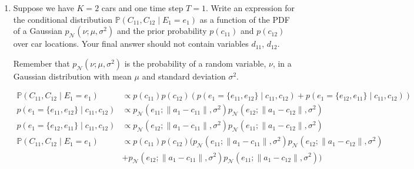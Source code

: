 \documentclass[10pt]{article}
\begin{document}
\begin{enumerate}[label=(\alph*)]

  \item Suppose we have $K = 2$ cars and one time step $T = 1$. Write an expression for the conditional distribution $\mathbb{P}(C_{11}, C_{12} \mid E_1 = e_1)$ as a function of the PDF of a Gaussian $p_{\mathcal{N}}(\nu; \mu, \sigma^2)$ and the prior probability $p(c_{11})$ and $p(c_{12})$ over car locations. Your final answer should not contain variables $d_{11}$, $d_{12}$.
  
  Remember that $p_{\mathcal{N}}(\nu; \mu, \sigma^2)$ is the probability of a random variable, $\nu$, in a Gaussian distribution with mean $\mu$ and standard deviation $\sigma^2$. 
  
  \begin{center}
	\end{center}
	
	\begin{align*}
	\mathbb{P}(C_{11}, C_{12} \mid E_1 = e_1) &\propto p(c_{11}) p(c_{12}) (p(e_1 = \{ e_{11}, e_{12} \} \mid c_{11}, c_{12}) + p(e_1 = \{ e_{12}, e_{11} \} \mid c_{11}, c_{12}))\\
	p(e_1 = \{ e_{11}, e_{12} \} \mid c_{11}, c_{12}) &\propto p_{\mathcal{N}}(e_{11}; \lVert a_1 - c_{11} \rVert, \sigma^2) p_{\mathcal{N}}(e_{12}; \lVert a_1 - c_{12} \rVert, \sigma^2)\\
	p(e_1 = \{ e_{12}, e_{11} \} \mid c_{11}, c_{12}) &\propto p_{\mathcal{N}}(e_{12}; \lVert a_1 - c_{11} \rVert, \sigma^2) p_{\mathcal{N}}(e_{11}; \lVert a_1 - c_{12} \rVert, \sigma^2)\\
	\mathbb{P}(C_{11}, C_{12} \mid E_1 = e_1) &\propto p(c_{11}) p(c_{12}) (p_{\mathcal{N}}(e_{11}; \lVert a_1 - c_{11} \rVert, \sigma^2) p_{\mathcal{N}}(e_{12}; \lVert a_1 - c_{12} \rVert, \sigma^2)\\
	&+ p_{\mathcal{N}}(e_{12}; \lVert a_1 - c_{11} \rVert, \sigma^2) p_{\mathcal{N}}(e_{11}; \lVert a_1 - c_{12} \rVert, \sigma^2))
	\end{align*}
  

\end{enumerate}
\end{document}
